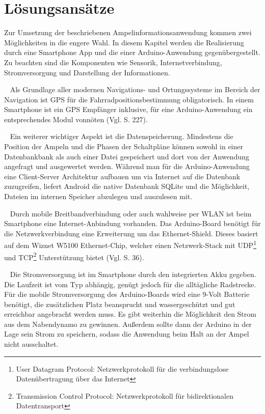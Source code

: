 \chapter{\label{chap:entscheidung}Lösungsansätze}
Zur Umsetzung der beschriebenen Ampelinformationsanwendung kommen zwei Möglichkeiten in die engere Wahl. In diesem Kapitel werden die Realisierung durch eine \gls{Smartphone} \Gls{App} und die einer \gls{Arduino}-Anwendung gegenübergestellt. Zu beachten sind die Komponenten wie Sensorik, Internetverbindung, Stromversorgung und Darstellung der Informationen.\\
\begin{description}[leftmargin=0.7cm,style=nextline]
  \item[\gls{GPS}] ~ Als Grundlage aller modernen Navigations- und Ortungssysteme im Bereich der Navigation ist \gls{GPS} für die Fahrradpositionsbestimmung obligatorisch. In einem \gls{Smartphone} ist ein \gls{GPS} Empfänger inklusive, für eine \gls{Arduino}-Anwendung ein entsprechendes Modul vonnöten (Vgl. \cite{arduino} S. 227).\\
 \item[Datenspeicherung] ~ Ein weiterer wichtiger Aspekt ist die Datenspeicherung. Mindestens die Position der Ampeln und die Phasen der Schaltpläne können sowohl in einer Datenbankbank als auch einer Datei gespeichert und dort von der Anwendung angefragt und ausgewertet werden. Während man für die \gls{Arduino}-Anwendung eine Client-Server Architektur aufbauen um via Internet auf die Datenbank zuzugreifen, liefert Android die native Datenbank SQLite und die Möglichkeit, Dateien im internen Speicher abzulegen und auszulesen mit.\\
  \item[Internetverbindung] ~ Durch mobile Breitbandverbindung oder auch wahlweise per \gls{WLAN} ist beim \gls{Smartphone} eine Internet-Anbindung vorhanden. Das \gls{Arduino}-Board benötigt für die Netzwerkverbindung eine Erweiterung um das Ethernet-Shield. Dieses basiert auf dem Wiznet W5100 Ethernet-Chip, welcher einen Netzwerk-Stack mit UDP\footnote{ User Datagram Protocol: Netzwerkprotokoll für die verbindungslose Datenübertragung über das Internet } und TCP\footnote{ Transmission Control Protocol: Netzwerkprotokoll für bidirektionalen Datentransport} Unterstützung bietet (Vgl. \cite{arduino} S. 36).\\
  \item[Stromversorgung] ~ Die Stromversorgung ist im \gls{Smartphone} durch den integrierten Akku gegeben. Die Laufzeit ist vom Typ abhängig, genügt jedoch für die alltägliche Radstrecke. Für die mobile Stromversorgung des \gls{Arduino}-Boards wird eine 9-Volt Batterie benötigt, die zusätzlichen Platz beansprucht und wassergeschützt und gut erreichbar angebracht werden muss. Es gibt weiterhin die Möglichkeit den Strom aus dem Nabendynamo zu gewinnen. Außerdem sollte dann der \gls{Arduino} in der Lage sein Strom zu speichern, sodass die Anwendung beim Halt an der Ampel nicht ausschaltet.\\

\end{description}

